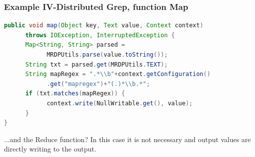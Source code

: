\documentclass[xcolor=dvipsnames,dvip,notes=show,table]{beamer}
\begin{document}


\begin{frame}[fragile]
  \frametitle{Example IV-Distributed Grep, function Map}

\begin{lstlisting}[language=Java]
public void map(Object key, Text value, Context context)
      throws IOException, InterruptedException {
      Map<String, String> parsed = 
            MRDPUtils.parse(value.toString());
      String txt = parsed.get(MRDPUtils.TEXT);
      String mapRegex = ".*\\b"+context.getConfiguration()
            .get("mapregex")+"(.)*\\b.*";
      if (txt.matches(mapRegex)) {
            context.write(NullWritable.get(), value);
      }
}
\end{lstlisting}
\tiny

\begin{alertblock}{...and the Reduce function?}
 In this case it is not necessary and output values are directly writing to the output.
\end{alertblock}

\end{frame}





\end{document}
